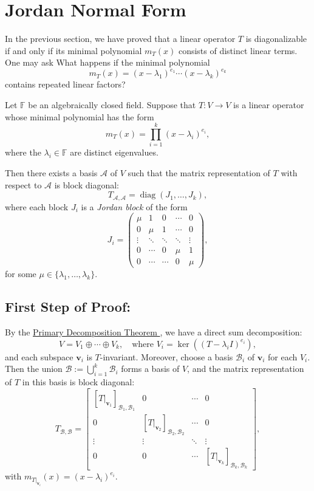 \section{Jordan Normal Form}

In the previous section, we have proved that a linear operator \( T \) is diagonalizable if and only if its minimal polynomial $m_T(x)$ consists of distinct linear terms. One may ask What happens if the minimal polynomial 
\[ m_T(x) = (x-\lambda_1)^{e_1}\cdots (x-\lambda_k)^{e_k}\] 
contains repeated linear factors? 

\begin{theorem}\label{thm:jordan-normal-form}
Let \( \mathbb{F} \) be an algebraically closed field. Suppose that \( T : V \to V \) is a linear operator whose minimal polynomial has the form
\[
m_T(x) = \prod_{i=1}^k (x - \lambda_i)^{e_i},
\]
where the \( \lambda_i \in \mathbb{F} \) are distinct eigenvalues.

Then there exists a basis \( \mathcal{A} \) of \( V \) such that the matrix representation of \( T \) with respect to \( \mathcal{A} \) is block diagonal:
\[
T_{\mathcal{A}, \mathcal{A}} = \operatorname{diag}(J_1, \ldots, J_k),
\]
where each block \( J_i \) is a \emph{Jordan block} of the form
\[
J_i = \begin{pmatrix}
\mu & 1 & 0 & \cdots & 0 \\
0 & \mu & 1 & \cdots & 0 \\
\vdots & \ddots & \ddots & \ddots & \vdots \\
0 & \cdots & 0 & \mu & 1 \\
0 & \cdots & \cdots & 0 & \mu
\end{pmatrix},
\]
for some \( \mu \in \{ \lambda_1, \ldots, \lambda_k \} \).
\end{theorem}

\subsection{First Step of Proof:}
By the \hyperref[thm:primary-decomposition]{Primary Decomposition Theorem }, we have a direct sum decomposition:
\[
V = V_1 \oplus \cdots \oplus V_k,
\quad \text{where } V_i = \ker \left( (T - \lambda_i I)^{e_i} \right),
\]
and each subspace \( \mathbf{v}_i \) is \( T \)-invariant.
Moreover, choose a basis \( \mathcal{B}_i \) of \( \mathbf{v}_i \) for each $V_i$. Then the union \(\mathcal{B} := \bigcup_{i=1}^k \mathcal{B}_i
\) forms a basis of \( V \), and the matrix representation of \( T \) in this basis is block diagonal:
\[
T_{\mathcal{B}, \mathcal{B}} =
\begin{bmatrix}
[T|_{\mathbf{v}_1}]_{\mathcal{B}_1, \mathcal{B}_1} & 0 & \cdots & 0 \\
0 & [T|_{\mathbf{v}_2}]_{\mathcal{B}_2, \mathcal{B}_2} & \cdots & 0 \\
\vdots & \vdots & \ddots & \vdots \\
0 & 0 & \cdots & [T|_{\mathbf{v}_k}]_{\mathcal{B}_k, \mathcal{B}_k}
\end{bmatrix},
\]
with \( m_{T|_{\mathbf{v}_i}}(x) = (x - \lambda_i)^{e_i} \).

